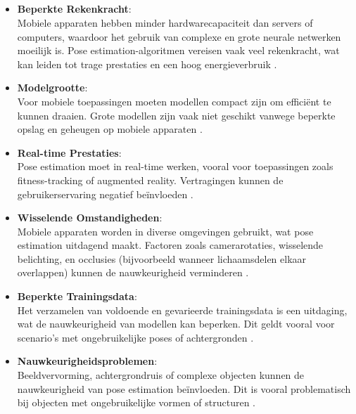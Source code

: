 \subsection{}%
\label{subsec:uitdagingen-van-pose-estimation-op-mobiele-apparaten}
\begin{itemize}
    \item \textbf{Beperkte Rekenkracht}: \\
    Mobiele apparaten hebben minder hardwarecapaciteit dan servers of computers, waardoor het gebruik van complexe en grote neurale netwerken moeilijk is. Pose estimation-algoritmen vereisen vaak veel rekenkracht, wat kan leiden tot trage prestaties en een hoog energieverbruik \autocite{LiuEtAl2022}.

    \item \textbf{Modelgrootte}: \\
    Voor mobiele toepassingen moeten modellen compact zijn om efficiënt te kunnen draaien. Grote modellen zijn vaak niet geschikt vanwege beperkte opslag en geheugen op mobiele apparaten \autocite{HouEtAl2020}.

    \item \textbf{Real-time Prestaties}: \\
    Pose estimation moet in real-time werken, vooral voor toepassingen zoals fitness-tracking of augmented reality. Vertragingen kunnen de gebruikerservaring negatief beïnvloeden \autocite{HouEtAl2020}.

    \item \textbf{Wisselende Omstandigheden}: \\
    Mobiele apparaten worden in diverse omgevingen gebruikt, wat pose estimation uitdagend maakt. Factoren zoals camerarotaties, wisselende belichting, en occlusies (bijvoorbeeld wanneer lichaamsdelen elkaar overlappen) kunnen de nauwkeurigheid verminderen \autocite{SulongEtAl2023}.

    \item \textbf{Beperkte Trainingsdata}: \\
    Het verzamelen van voldoende en gevarieerde trainingsdata is een uitdaging, wat de nauwkeurigheid van modellen kan beperken. Dit geldt vooral voor scenario’s met ongebruikelijke poses of achtergronden \autocite{PauloEtAl2024}.

    \item \textbf{Nauwkeurigheidsproblemen}: \\
    Beeldvervorming, achtergrondruis of complexe objecten kunnen de nauwkeurigheid van pose estimation beïnvloeden. Dit is vooral problematisch bij objecten met ongebruikelijke vormen of structuren \autocite{SulongEtAl2023}.
\end{itemize}

